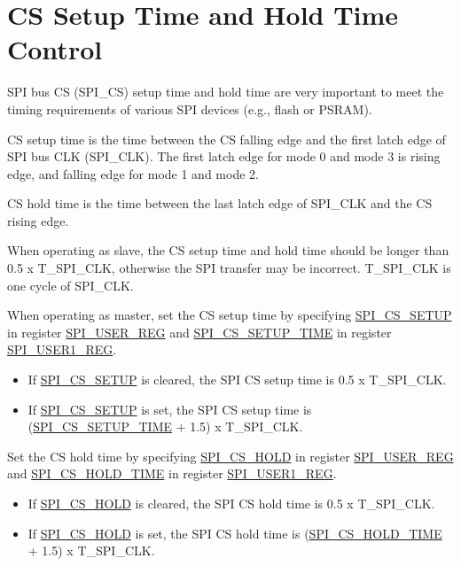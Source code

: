 \documentclass[main\_\_EN.tex]{subfiles}
\begin{document}
\section{CS Setup Time and Hold Time Control}\label{sec:gp-spi2-cs-timing}

SPI bus CS (SPI\_CS) setup time and hold time are very important to meet the timing requirements of various SPI devices (e.g., flash or PSRAM).

CS setup time is the time between the CS falling edge and the first latch edge of SPI bus CLK (SPI\_CLK). The first latch edge for mode 0 and mode 3 is rising edge, and falling edge for mode 1 and mode 2.

CS hold time is the time between the last latch edge of SPI\_CLK and the CS rising edge.

When operating as slave, the CS setup time and hold time should be longer than 0.5 x T\_SPI\_CLK, otherwise the SPI transfer may be incorrect. T\_SPI\_CLK is one cycle of SPI\_CLK.

When operating as master, set the CS setup time by specifying \hyperref[fielddesc:SPICSSETUP]{SPI\_CS\_SETUP} in register \hyperref[regdesc:SPIUSERREG]{SPI\_USER\_REG} and \hyperref[fielddesc:SPICSSETUPTIME]{SPI\_CS\_SETUP\_TIME} in register \hyperref[regdesc:SPIUSER1REG]{SPI\_USER1\_REG}.
    \begin{itemize}
        \item If \hyperref[fielddesc:SPICSSETUP]{SPI\_CS\_SETUP} is cleared, the SPI CS setup time is 0.5 x T\_SPI\_CLK.
        \item If \hyperref[fielddesc:SPICSSETUP]{SPI\_CS\_SETUP} is set, the SPI CS setup time is (\hyperref[fielddesc:SPICSSETUPTIME]{SPI\_CS\_SETUP\_TIME} + 1.5) x T\_SPI\_CLK.
    \end{itemize}

Set the CS hold time by specifying \hyperref[fielddesc:SPICSHOLD]{SPI\_CS\_HOLD} in register \hyperref[regdesc:SPIUSERREG]{SPI\_USER\_REG} and \hyperref[fielddesc:SPICSHOLDTIME]{SPI\_CS\_HOLD\_TIME} in register \hyperref[regdesc:SPIUSER1REG]{SPI\_USER1\_REG}.
    \begin{itemize}
        \item If \hyperref[fielddesc:SPICSHOLD]{SPI\_CS\_HOLD} is cleared, the SPI CS hold time is 0.5 x T\_SPI\_CLK.
        \item If \hyperref[fielddesc:SPICSHOLD]{SPI\_CS\_HOLD} is set, the SPI CS hold time is (\hyperref[fielddesc:SPICSHOLDTIME]{SPI\_CS\_HOLD\_TIME} + 1.5) x T\_SPI\_CLK.
    \end{itemize}
\end{document}
